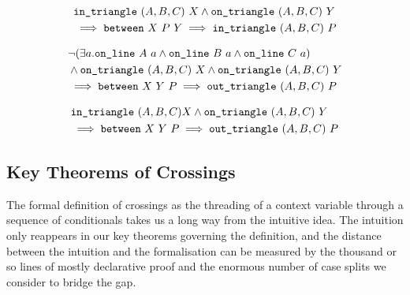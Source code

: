 \begin{equation}\label{eq:inTriangle2}
  \begin{split}
    &\texttt{in\_triangle}\ (A,B,C)\ X \wedge \texttt{on\_triangle}\ (A,B,C)\ Y\\
    &\implies \texttt{between}\ X\ P\ Y \implies \texttt{in\_triangle}\ (A,B,C)\ P
  \end{split}
\end{equation}

\begin{equation}\label{eq:outTriangle1}
  \begin{split}
    &\neg(\exists a.\texttt{on\_line}\ A\ a\wedge \texttt{on\_line}\ B\ a\wedge \texttt{on\_line}\ C\ a)\\
    &\wedge \texttt{on\_triangle}\ (A,B,C)\ X \wedge \texttt{on\_triangle}\ (A,B,C)\ Y\\
    &\implies \texttt{between}\ X\ Y\ P \implies \texttt{out\_triangle}\ (A,B,C)\ P
  \end{split}
\end{equation}

\begin{equation}\label{eq:outTriangle2}
  \begin{split}
    &\texttt{in\_triangle}\ (A,B,C) X \wedge \texttt{on\_triangle}\ (A,B,C)\ Y\\
    &\implies \texttt{between}\ X\ Y\ P \implies \texttt{out\_triangle}\ (A,B,C)\ P
  \end{split}
\end{equation}

\subsection{Key Theorems of Crossings}\label{sec:CrossingVerification}
The formal definition of crossings as the threading of a context variable through a sequence of conditionals takes us a long way from the intuitive idea. The intuition only reappears in our key theorems governing the definition, and the distance between the intuition and the formalisation can be measured by the thousand or so lines of mostly declarative proof and the enormous number of case splits we consider to bridge the gap.

